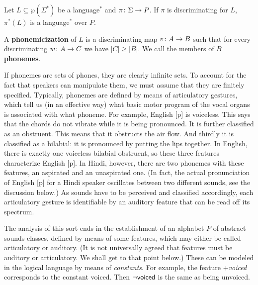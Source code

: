 \begin{lem}
Let $L \subseteq \wp(\Sigma^{\ast})$ be a language$^{\ast}$ and 
$\pi \colon \Sigma \rightarrow P$. If $\pi$ is discriminating for $L$, 
$\pi^{\ast}(L)$ is a language$^{\ast}$ over $P$.
\end{lem}
\begin{defn}
\label{defn:preph}
A \textbf{phonemicization} of $L$ is a discriminating map 
$v \colon A \rightarrow B$ such that for every discriminating 
$w \colon A \rightarrow C$ we have $|C| \geq |B|$.
We call the members of $B$ \textbf{phonemes}.
\end{defn}
If phonemes are sets of phones, they are clearly infinite sets.
To account for the fact that speakers can manipulate them, we must 
assume that they are finitely specified. Typically, phonemes are 
defined by means of articulatory gestures, which tell us (in an 
effective way) what basic motor program of the vocal organs is 
associated with what phoneme. For example, English [p] is 
voiceless. This says that the chords do not vibrate while 
it is being pronounced. It is further classified as an obstruent. 
This means that it obstructs the air flow. And thirdly 
it is classified as a bilabial: it is pronounced by putting the lips 
together. In English, there is exactly one voiceless bilabial obstruent, 
so these three features characterize English [p]. In Hindi, however, 
there are two phonemes with these features, an aspirated and an 
unaspirated one. (In fact, the actual pronunciation of English [p] 
for a Hindi speaker oscillates between two different sounds, see the 
discussion below.) As sounds have to be perceived and classified accordingly, 
each articulatory gesture is identifiable by an auditory feature that 
can be read off its spectrum. 

The analysis of this sort ends in the establishment of an alphabet $P$
of abstract sounds classes, defined by means of some features, which 
may either be called articulatory or auditory. (It is not universally 
agreed that features must be auditory or articulatory. We shall get to 
that point below.) These can be modeled in the logical language by means 
of {\it constants}. For example, the feature +{\it voiced\/} corresponds
to the constant \textsf{voiced}. Then $\neg \textsf{voiced}$ is the 
same as being unvoiced.

